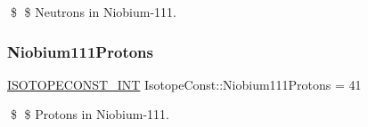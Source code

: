 \$ \$ Neutrons in Niobium-\/111. \mbox{\label{group___isotope_const-_niobium-_nb111_ga5545ea2108969311e248d6be2d82ea9f}} 
\subsubsection{\texorpdfstring{Niobium111\+Protons}{Niobium111Protons}}
{\footnotesize\ttfamily \mbox{\hyperlink{group___isotope_const-_macros_ga5f18360b3e99483a35c32d789e62621c}{I\+S\+O\+T\+O\+P\+E\+C\+O\+N\+S\+T\+\_\+\+I\+NT}} Isotope\+Const\+::\+Niobium111\+Protons = 41}

\$ \$ Protons in Niobium-\/111. 